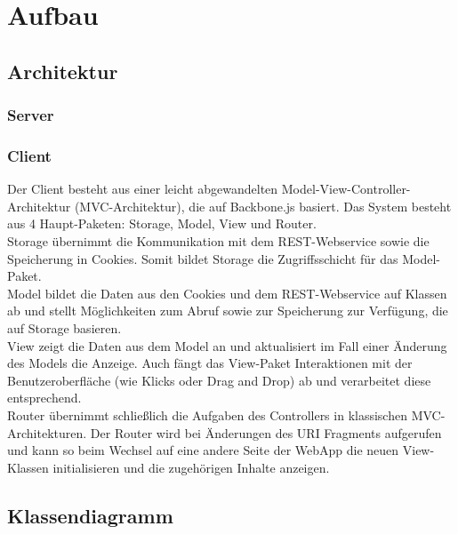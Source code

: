 \section{Aufbau}

\subsection{Architektur}

\subsubsection{Server}

\subsubsection{Client}
Der Client besteht aus einer leicht abgewandelten Model-View-Controller-Architektur (MVC-Architektur), die auf Backbone.js \cite{backbone} basiert.
Das System besteht aus 4 Haupt-Paketen: Storage, Model, View und Router.\\
Storage übernimmt die Kommunikation mit dem REST-Webservice sowie die Speicherung in Cookies. Somit bildet Storage die Zugriffsschicht für das Model-Paket. \\
Model bildet die Daten aus den Cookies und dem REST-Webservice auf Klassen ab und stellt Möglichkeiten zum Abruf sowie zur Speicherung zur Verfügung, die auf Storage basieren.\\
View zeigt die Daten aus dem Model an und aktualisiert im Fall einer Änderung des Models die Anzeige. Auch fängt das View-Paket Interaktionen mit der Benutzeroberfläche (wie Klicks oder Drag and Drop) ab und verarbeitet diese entsprechend.\\
Router übernimmt schließlich die Aufgaben des Controllers in klassischen MVC-Architekturen. Der Router wird bei Änderungen des URI Fragments aufgerufen und kann so beim Wechsel auf eine andere Seite der WebApp die neuen View-Klassen initialisieren und die zugehörigen Inhalte anzeigen.

\subsection{Klassendiagramm}  %